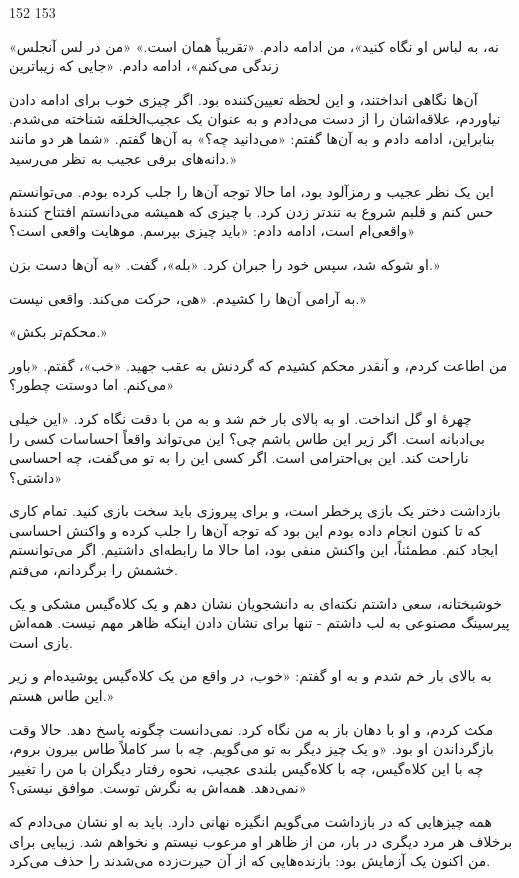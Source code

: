 152 153

«نه، به لباس او نگاه کنید»، من ادامه دادم. «تقریباً همان است.» «من در لس آنجلس زندگی می‌کنم»، ادامه دادم. «جایی که زیباترین

آن‌ها نگاهی انداختند، و این لحظه تعیین‌کننده بود. اگر چیزی خوب برای ادامه دادن نیاوردم، علاقه‌اشان را از دست می‌دادم و به عنوان یک عجیب‌الخلقه شناخته می‌شدم. بنابراین، ادامه دادم و به آن‌ها گفتم: «می‌دانید چه؟» به آن‌ها گفتم. «شما هر دو مانند دانه‌های برفی عجیب به نظر می‌رسید.» 

این یک نظر عجیب و رمزآلود بود، اما حالا توجه آن‌ها را جلب کرده بودم. می‌توانستم حس کنم و قلبم شروع به تندتر زدن کرد. با چیزی که همیشه می‌دانستم افتتاح کنندهٔ واقعی‌ام است، ادامه دادم: «باید چیزی بپرسم. موهایت واقعی است؟»

او شوکه شد، سپس خود را جبران کرد. «بله»، گفت. «به آن‌ها دست بزن.»

به آرامی آن‌ها را کشیدم. «هی، حرکت می‌کند. واقعی نیست.»

«محکم‌تر بکش.»

من اطاعت کردم، و آنقدر محکم کشیدم که گردنش به عقب جهید. «خب»، گفتم. «باور می‌کنم. اما دوستت چطور؟»

چهرهٔ او گل انداخت. او به بالای بار خم شد و به من با دقت نگاه کرد. «این خیلی بی‌ادبانه است. اگر زیر این طاس باشم چی؟ این می‌تواند واقعاً احساسات کسی را ناراحت کند. این بی‌احترامی است. اگر کسی این را به تو می‌گفت، چه احساسی داشتی؟»

بازداشت دختر یک بازی پرخطر است، و برای پیروزی باید سخت بازی کنید. تمام کاری که تا کنون انجام داده بودم این بود که توجه آن‌ها را جلب کرده و واکنش احساسی ایجاد کنم. مطمئناً، این واکنش منفی بود، اما حالا ما رابطه‌ای داشتیم. اگر می‌توانستم خشمش را برگردانم، می‌فتم.

خوشبختانه، سعی داشتم نکته‌ای به دانشجویان نشان دهم و یک کلاه‌گیس مشکی و یک پیرسینگ مصنوعی به لب داشتم - تنها برای نشان دادن اینکه ظاهر مهم نیست. همه‌اش بازی است.

به بالای بار خم شدم و به او گفتم: «خوب، در واقع من یک کلاه‌گیس پوشیده‌ام و زیر این طاس هستم.»

مکث کردم، و او با دهان باز به من نگاه کرد. نمی‌دانست چگونه پاسخ دهد. حالا وقت بازگرداندن او بود. «و یک چیز دیگر به تو می‌گویم. چه با سر کاملاً طاس بیرون بروم، چه با این کلاه‌گیس، چه با کلاه‌گیس بلندی عجیب، نحوه رفتار دیگران با من را تغییر نمی‌دهد. همه‌اش به نگرش توست. موافق نیستی؟»

همه چیزهایی که در بازداشت می‌گویم انگیزه نهانی دارد. باید به او نشان می‌دادم که برخلاف هر مرد دیگری در بار، من از ظاهر او مرعوب نیستم و نخواهم شد. زیبایی برای من اکنون یک آزمایش بود: بازنده‌هایی که از آن حیرت‌زده می‌شدند را حذف می‌کرد.

